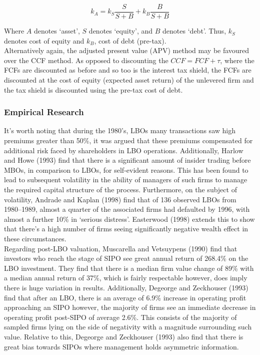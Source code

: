 \documentclass[11pt, english]{article}
\begin{document}
	$$k_A=k_S\frac{S}{S+B}+k_B\frac{B}{S+B}$$

	Where $A$ denotes `asset', $S$ denotes `equity', and $B$ denotes `debt'. Thus, $k_S$ denotes cost of equity and $k_B$, cost of debt (pre-tax).\\
		
	Alternatively again, the adjusted present value (APV) method may be favoured over the CCF method. As opposed to discounting the $CCF=FCF+\tau$, where the FCFs are discounted as before and so too is the interest tax shield, the FCFs are discounted at the cost of equity (expected asset return) of the unlevered firm and the tax shield is discounted using the pre-tax cost of debt.

	\subsubsection*{Empirical Research}

	It's worth noting that during the 1980's, LBOs many transactions saw high premiums greater than 50\%, it was argued that these premiums compensated for additional risk faced by shareholders in LBO operations. Additionally, Harlow and Howe (1993) find that there is a significant amount of insider trading before MBOs, in comparison to LBOs, for self-evident reasons. This has been found to lead to subsequent volatility in the ability of managers of such firms to manage the required capital structure of the process. Furthermore, on the subject of volatility, Andrade and Kaplan (1998) find that of 136 observed LBOs from 1980--1989, almost a quarter of the associated firms had defaulted by 1996, with almost a further 10\% in `serious distress'. Easterwood (1998) extends this to show that there's a high number of firms seeing significantly negative wealth effect in these circumstances.\\

	Regarding post-LBO valuation, Muscarella and Vetsuypens (1990) find that investors who reach the stage of SIPO see great annual return of 268.4\% on the LBO investment. They find that there is a median firm value change of 89\% with a median annual return of 37\%, which is fairly respectable however, does imply there is huge variation in results. Additionally, Degeorge and Zeckhouser (1993) find that after an LBO, there is an average of 6.9\% increase in operating profit approaching an SIPO however, the majority of firms see an immediate decrease in operating profit post-SIPO of average 2.6\%. This consists of the majority of sampled firms lying on the side of negativity with a magnitude surrounding such value. Relative to this, Degeorge and Zeckhouser (1993) also find that there is great bias towards SIPOs where management holds asymmetric information.\\
\end{document}
